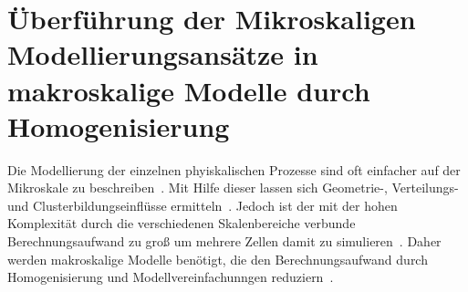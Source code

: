 \section{\label{sec:homogenisation}Überführung der Mikroskaligen Modellierungsansätze in makroskalige Modelle durch Homogenisierung}

Die Modellierung der einzelnen phyiskalischen Prozesse sind oft einfacher auf der Mikroskale zu beschreiben~\cite{Plett2015}. Mit Hilfe dieser lassen sich Geometrie-, Verteilungs- und Clusterbildungseinflüsse ermitteln~\cite{Newman2021}. Jedoch ist der mit der hohen Komplexität durch die verschiedenen Skalenbereiche verbunde Berechnungsaufwand zu groß um mehrere Zellen damit zu simulieren~\cite{Liu2019}. Daher werden makroskalige Modelle benötigt, die den Berechnungsaufwand durch Homogenisierung und Modellvereinfachunngen reduziern~\cite{Plett2015}.

